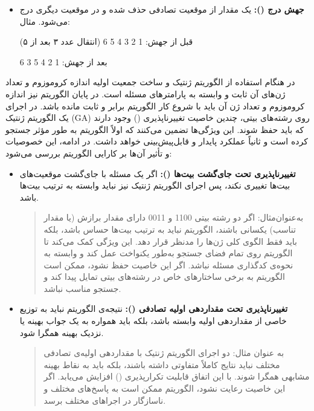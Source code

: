 \documentclass[12pt]{exam}
\begin{document}
\begin{questions}
\begin{parts}
\begin{enumerate}
\begin{itemize}
			\item \textbf{جهش درج ():}
			یک مقدار از موقعیت تصادفی حذف شده و در موقعیت دیگری درج می‌شود.
			مثال:
			
			قبل از جهش: 1 2 3 4 5 6  (انتقال عدد ۳ بعد از ۵)
			
			بعد از جهش: 1 2 4 5 3 6
			
		\end{itemize}
	\end{enumerate}
	\end{parts}
	
	\question
	در هنگام استفاده از الگوریتم ژنتیک و ساخت جمعیت اولیه اندازه کروموزوم و تعداد ژن‌های آن ثابت و وابسته به پارامترهای مسئله است. در پایان الگوریتم نیز اندازه کروموزوم و تعداد ژن آن باید با شروع کار الگوریتم برابر و ثابت مانده باشد. در اجرای یک الگوریتم ژنتیک (GA) روی رشته‌های بیتی، چندین خاصیت تغییرناپذیری
	 () وجود دارند که باید حفظ شوند. این ویژگی‌ها تضمین می‌کنند که اولاً الگوریتم به طور مؤثر جستجو کرده است و ثانیاً عملکرد پایدار و قابل‌پیش‌بینی خواهد داشت. در ادامه، این خصوصیات و تأثیر آن‌ها بر کارایی الگوریتم بررسی می‌شود:
	 
	 \begin{itemize}
	 	\item \textbf{تغییرناپذیری تحت جای‌گشت بیت‌ها ():}
	 	اگر یک مسئله با جای‌گشت موقعیت‌های بیت‌ها تغییری نکند، پس اجرای الگوریتم ژنتیک نیز نباید وابسته به ترتیب بیت‌ها باشد.
	 	
\begin{quote}
	 			به‌عنوان‌مثال:
	 		اگر دو رشته بیتی 1100 و 0011  دارای مقدار برازش (یا مقدار تناسب) یکسانی باشند، الگوریتم نباید به ترتیب بیت‌ها حساس باشد، بلکه باید فقط الگوی کلی ژن‌ها را مدنظر قرار دهد. این ویژگی کمک می‌کند تا الگوریتم روی تمام فضای جستجو به‌طور یکنواخت عمل کند و وابسته به نحوه‌ی کدگذاری مسئله نباشد. اگر این خاصیت حفظ نشود، ممکن است الگوریتم به برخی ساختارهای خاص در رشته‌های بیتی تمایل پیدا کند و جستجو مناسب نباشد.

\end{quote}
	 		
	 
	 	 		\item \textbf{تغییرناپذیری تحت مقداردهی اولیه تصادفی ():}
	 نتیجه‌ی الگوریتم نباید به توزیع خاصی از مقداردهی اولیه وابسته باشد، بلکه باید همواره به یک جواب بهینه یا نزدیک بهینه همگرا شود.
	 	\begin{quote}
 به عنوان مثال:
دو اجرای الگوریتم ژنتیک با مقداردهی اولیه‌ی تصادفی مختلف نباید نتایج کاملاً متفاوتی داشته باشند، بلکه باید به نقاط بهینه مشابهی همگرا شوند. با این اتفاق قابلیت تکرارپذیری 
() افزایش می‌یابد. اگر این خاصیت رعایت نشود، الگوریتم ممکن است به پاسخ‌های مختلف و ناسازگار در اجراهای مختلف برسد.


\end{quote}
\end{itemize}
\end{questions}
\end{document}
